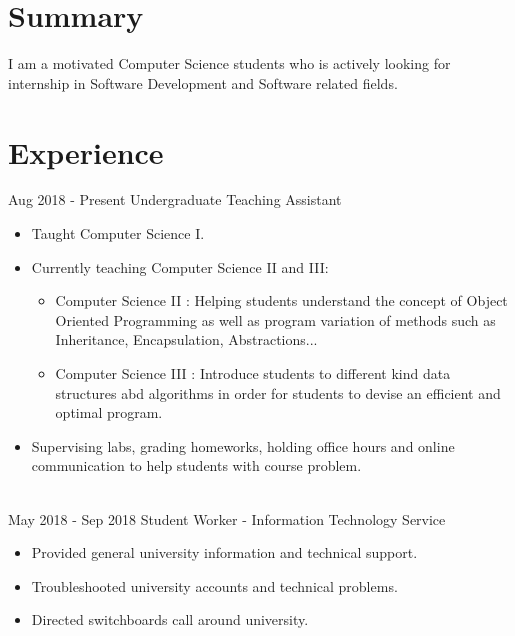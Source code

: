 \documentclass[letterpaper]{twentysecondcv} %
\begin{document}
\makeprofile %
 \section{Summary}
    I am a motivated Computer Science students who is actively looking for internship in Software Development and Software related fields.

\section{Experience}

\begin{twenty} %
\twentyitem
    	{Aug 2018 -}
		{Present}
        {Undergraduate Teaching Assistant}
        {}
        {}
        {\begin{itemize}
        \item Taught Computer Science I.
        \item Currently teaching Computer Science II and III:
            \begin{itemize}
                \item Computer Science II : Helping students understand the concept of Object Oriented Programming as well as program
                variation of methods such as Inheritance, Encapsulation, Abstractions... 
                \item Computer Science III : Introduce students to different kind data structures abd algorithms in order for students to devise an efficient and optimal program.
            \end{itemize}
        \item Supervising labs, grading homeworks, holding office hours and online communication to help students with course problem.
        \end{itemize}}
        \\
	\twentyitem
    	{May 2018 -}
		{Sep 2018}
        {Student Worker - Information Technology Service}
        {}
        {}
        {
        {\begin{itemize}
        \item Provided general university information and technical support.
        \item Troubleshooted university accounts and technical problems.
        \item Directed switchboards call around university.
    \end{itemize}}
        }
    
        
\end{twenty}
\end{document}
